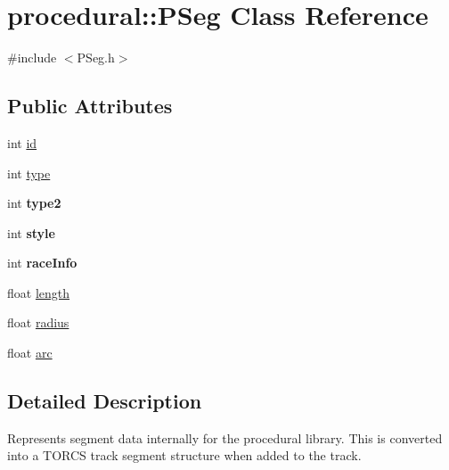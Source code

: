 \hypertarget{classprocedural_1_1_p_seg}{\section{procedural\-:\-:P\-Seg Class Reference}
\label{classprocedural_1_1_p_seg}
}


{\ttfamily \#include $<$P\-Seg.\-h$>$}

\subsection*{Public Attributes}
\begin{DoxyCompactItemize}
\item 
int \hyperlink{classprocedural_1_1_p_seg_ad1524e67c78c9efda387d8207b085b4b}{id}
\item 
int \hyperlink{classprocedural_1_1_p_seg_ac083c27ad9a4026bef178c04f5df7360}{type}
\item 
\hypertarget{classprocedural_1_1_p_seg_a6c2b21ee4854f29db137e00a5ccab069}{int {\bfseries type2}}\label{classprocedural_1_1_p_seg_a6c2b21ee4854f29db137e00a5ccab069}

\item 
\hypertarget{classprocedural_1_1_p_seg_a558148330387fced9aa6fb6e415b6cf0}{int {\bfseries style}}\label{classprocedural_1_1_p_seg_a558148330387fced9aa6fb6e415b6cf0}

\item 
\hypertarget{classprocedural_1_1_p_seg_a3339f45c1bd0e398e63a46f5d0f429ed}{int {\bfseries race\-Info}}\label{classprocedural_1_1_p_seg_a3339f45c1bd0e398e63a46f5d0f429ed}

\item 
float \hyperlink{classprocedural_1_1_p_seg_a48e7abd7a4ecb5881e8db43ee9ed1353}{length}
\item 
float \hyperlink{classprocedural_1_1_p_seg_ad1c1317a1c5e49cbb57ec0c752de4dea}{radius}
\item 
float \hyperlink{classprocedural_1_1_p_seg_a6dbb96b2dc041e44b62f519f88c39fd4}{arc}
\end{DoxyCompactItemize}


\subsection{Detailed Description}
Represents segment data internally for the procedural library. This is converted into a T\-O\-R\-C\-S track segment structure when added to the track. 

